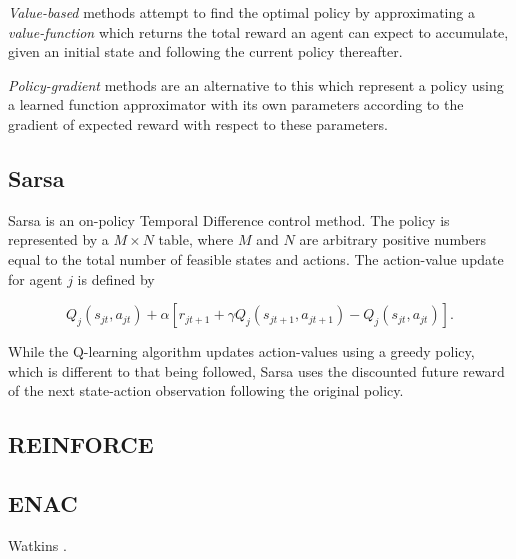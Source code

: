\textit{Value-based} methods attempt to find the optimal policy by
approximating a \textit{value-function} which returns the total reward an
agent can expect to accumulate, given an initial state and following the
current policy thereafter.

\textit{Policy-gradient} methods are an alternative to this which
represent a policy using a learned function approximator with its own
parameters %
according to the gradient of expected reward with respect to these parameters.

\subsection{Sarsa}
Sarsa is an on-policy Temporal Difference control method.  The
policy is represented by a $M \times N$ table, where $M$ and $N$ are
arbitrary positive numbers equal to the total number of feasible states and
actions. The action-value update for agent $j$ is defined by

\begin{equation}
Q_j(s_{jt},a_{jt}) + \alpha [r_{jt+1} + \gamma Q_j(s_{jt+1},a_{jt+1}) -
Q_j(s_{jt},a_{jt})].
\end{equation}

While the Q-learning algorithm updates action-values using a greedy policy,
which is different to that being followed, Sarsa uses the discounted future
reward of the next state-action observation following the original policy.

\subsection{REINFORCE}
\label{sec:reinforce}

\subsection{ENAC}
\label{sec:enac}
Watkins \cite{watkins:1989}.
